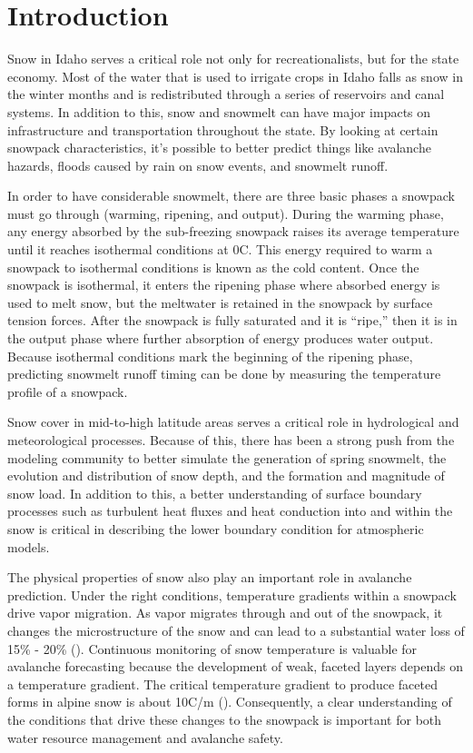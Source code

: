 \chapter{Introduction}
Snow in Idaho serves a critical role not only for recreationalists, but for the state economy. Most of the water that is used to irrigate crops in Idaho falls as snow in the winter months and is redistributed through a series of reservoirs and canal systems. In addition to this, snow and snowmelt can have major impacts on infrastructure and transportation throughout the state. By looking at certain snowpack characteristics, it’s possible to better predict things like avalanche hazards, floods caused by rain on snow events, and snowmelt runoff. 

In order to have considerable snowmelt, there are three basic phases a snowpack must go through (warming, ripening, and output). During the warming phase, any energy absorbed by the sub-freezing snowpack raises its average temperature until it reaches isothermal conditions at 0\textdegree C. This energy required to warm a snowpack to isothermal conditions is known as the cold content. Once the snowpack is isothermal, it enters the ripening phase where absorbed energy is used to melt snow, but the meltwater is retained in the snowpack by surface tension forces. After the snowpack is fully saturated and it is “ripe,” then it is in the output phase where further absorption of energy produces water output. Because isothermal conditions mark the beginning of the ripening phase, predicting snowmelt runoff timing can be done by measuring the temperature profile of a snowpack.

Snow cover in mid-to-high latitude areas serves a critical role in hydrological and meteorological processes. Because of this, there has been a strong push from the modeling community to better simulate the generation of spring snowmelt, the evolution and distribution of snow depth, and the formation and magnitude of snow load. In addition to this, a better understanding of surface boundary processes such as turbulent heat fluxes and heat conduction into and within the snow is critical in describing the lower boundary condition for atmospheric models.

The physical properties of snow also play an important role in avalanche prediction. Under the right conditions, temperature gradients within a snowpack drive vapor migration. As vapor migrates through and out of the snowpack, it changes the microstructure of the snow and can lead to a substantial water loss of 15\% - 20\% (\cite{hood_williams_cline_1999, marks_dozier_1992, kattelmann_elder_1991}). Continuous monitoring of snow temperature is valuable for avalanche forecasting because the development of weak, faceted layers depends on a temperature gradient. The critical temperature gradient to produce faceted forms in alpine snow is about 10\textdegree C/m (\cite{mcclung_schaerer_2009}). Consequently, a clear understanding of the conditions that drive these changes to the snowpack is important for both water resource management and avalanche safety.

